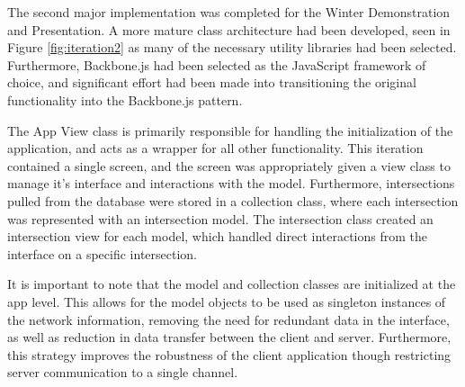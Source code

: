 \documentclass{report}
\begin{document}
The second major implementation was completed for the Winter Demonstration and Presentation. A more mature class architecture had been developed, seen in Figure \ref{fig:iteration2} as many of the necessary utility libraries had been selected. Furthermore, Backbone.js had been selected as the JavaScript framework of choice, and significant effort had been made into transitioning the original functionality into the Backbone.js pattern.

The App View class is primarily responsible for handling the initialization of the application, and acts as a wrapper for all other functionality. This iteration contained a single screen, and the screen was appropriately given a view class to manage it's interface and interactions with the model. Furthermore, intersections pulled from the database were stored in a collection class, where each intersection was represented with an intersection model. The intersection class created an intersection view for each model, which handled direct interactions from the interface on a specific intersection. 

It is important to note that the model and collection classes are initialized at the app level. This allows for the model objects to be used as singleton instances of the network information, removing the need for redundant data in the interface, as well as reduction in data transfer between the client and server. Furthermore, this strategy improves the robustness of the client application though restricting server communication to a single channel.
\end{document}
